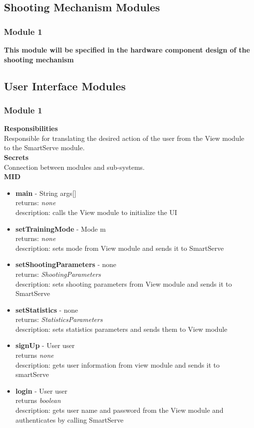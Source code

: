 \documentclass[11pt]{article}
\begin{document}
\subsection{Shooting Mechanism Modules}
\subsubsection*{Module 1}
\textbf{This module will be specified in the hardware component design of the shooting mechanism}
\subsection{User Interface Modules}
\subsubsection*{Module 1}
\textbf{Responsibilities} \\
Responsible for translating the desired action of the user from the View module to the SmartServe module. \\
\textbf{Secrets} \\
Connection between modules and sub-systems. \\
\textbf{MID} \\
\begin{itemize}
\item \textbf{main} - String args[] \\ returns: \textit{none} \\ description: calls the View module to initialize the UI
\item \textbf{setTrainingMode} - Mode m \\ returns: \textit{none} \\ description: sets mode from View module and sends it to SmartServe
\item \textbf{setShootingParameters} - none \\ returns: \textit{ShootingParameters} \\ description: sets shooting parameters from View module and sends it to SmartServe
\item \textbf{setStatistics} - none \\ returns: \textit{StatisticsParameters} \\ description: sets statistics parameters and sends them to View module
\item \textbf{signUp} - User user \\ returns \textit{none} \\ description: gets user information from view module and sends it to smartServe
\item \textbf{login} - User user \\ returns \textit{boolean} \\ description: gets user name and password from the View module and authenticates by calling SmartServe
\end{itemize}
\end{document}

